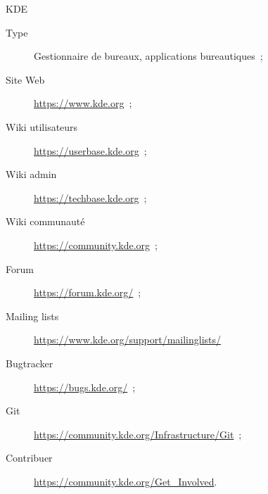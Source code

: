 \begin{frame}[fragile]{KDE}
 \begin{description}
  \item [Type] Gestionnaire de bureaux, applications bureautiques~;
  \item [Site Web] \url{https://www.kde.org}~;
  \item [Wiki utilisateurs] \url{https://userbase.kde.org}~;
  \item [Wiki admin] \url{https://techbase.kde.org}~;
  \item [Wiki communauté] \url{https://community.kde.org}~;
  \item [Forum] \url{https://forum.kde.org/}~;
  \item [Mailing lists] \url{https://www.kde.org/support/mailinglists/}
  \item [Bugtracker] \url{https://bugs.kde.org/}~;
  \item [Git] \url{https://community.kde.org/Infrastructure/Git}~;
  \item [Contribuer] \url{https://community.kde.org/Get_Involved}.
 \end{description}
\end{frame}
